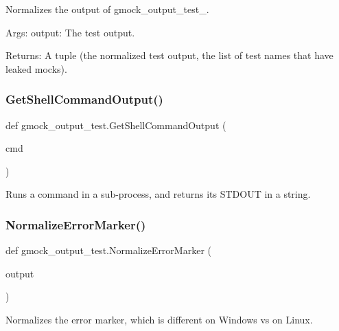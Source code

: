 \begin{DoxyVerb}Normalizes the output of gmock_output_test_.

Args:
  output: The test output.

Returns:
  A tuple (the normalized test output, the list of test names that have
  leaked mocks).
\end{DoxyVerb}
 \mbox{\label{namespacegmock__output__test_a001498a3e9bf552ee429e434eb00cb08}} 
\subsubsection{\texorpdfstring{Get\+Shell\+Command\+Output()}{GetShellCommandOutput()}}
{\footnotesize\ttfamily def gmock\+\_\+output\+\_\+test.\+Get\+Shell\+Command\+Output (\begin{DoxyParamCaption}\item[{}]{cmd }\end{DoxyParamCaption})}

\begin{DoxyVerb}Runs a command in a sub-process, and returns its STDOUT in a string.\end{DoxyVerb}
 \mbox{\label{namespacegmock__output__test_af3c1f95f19b9f048843a2d562d459b24}} 
\subsubsection{\texorpdfstring{Normalize\+Error\+Marker()}{NormalizeErrorMarker()}}
{\footnotesize\ttfamily def gmock\+\_\+output\+\_\+test.\+Normalize\+Error\+Marker (\begin{DoxyParamCaption}\item[{}]{output }\end{DoxyParamCaption})}

\begin{DoxyVerb}Normalizes the error marker, which is different on Windows vs on Linux.\end{DoxyVerb}
 \mbox{\label{namespacegmock__output__test_aa3c93f8085ff0886bf0d160d71af2452}} 

